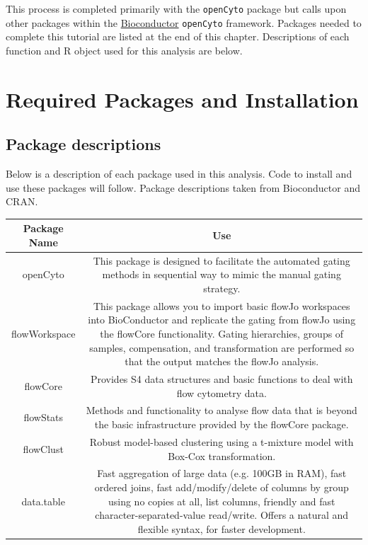 \documentclass[]{book}
\begin{document}
This process is completed primarily with the \texttt{openCyto} package but calls upon other packages within the \href{http://bioconductor.org/packages/release/bioc/html/openCyto.html}{Bioconductor} \texttt{openCyto} framework. Packages needed to complete this tutorial are listed at the end of this chapter. Descriptions of each function and R object used for this analysis are below.

\hypertarget{required-packages-and-installation}{%
\section{Required Packages and Installation}\label{required-packages-and-installation}}

\hypertarget{package-descriptions}{%
\subsection{Package descriptions}\label{package-descriptions}}

Below is a description of each package used in this analysis. Code to install and use these packages will follow. Package descriptions taken from Bioconductor and CRAN.

\begin{tabular}{c|c}
\hline
Package Name & Use\\
\hline
openCyto & This package is designed to facilitate the automated gating methods in sequential way to mimic the manual gating strategy.\\
\hline
flowWorkspace & This package allows you to import basic flowJo workspaces into BioConductor and replicate the gating from flowJo using the flowCore functionality. Gating hierarchies, groups of samples, compensation, and transformation are performed so that the output matches the flowJo analysis.\\
\hline
flowCore & Provides S4 data structures and basic functions to deal with flow cytometry data.\\
\hline
flowStats & Methods and functionality to analyse flow data that is beyond the basic infrastructure provided by the flowCore package.\\
\hline
flowClust & Robust model-based clustering using a t-mixture model with Box-Cox transformation.\\
\hline
data.table & Fast aggregation of large data (e.g. 100GB in RAM), fast ordered joins, fast add/modify/delete of columns by group using no copies at all, list columns, friendly and fast character-separated-value read/write. Offers a natural and flexible syntax, for faster development.\\
\hline
\end{tabular}
\end{document}
